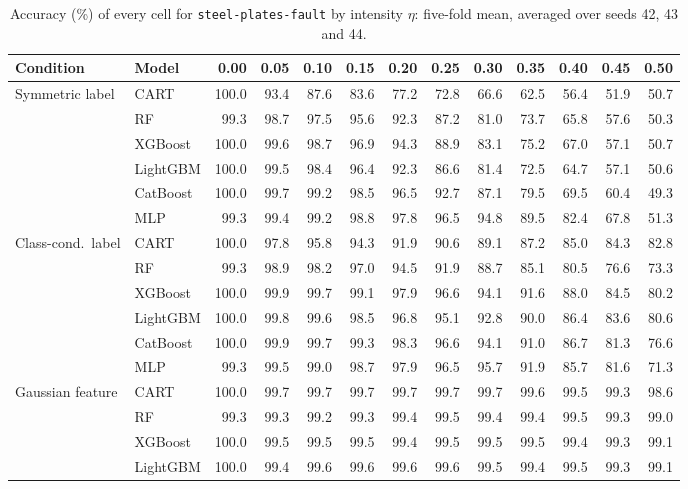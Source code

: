 \begin{table}[p]
\centering
\tiny
\setlength{\tabcolsep}{2.6pt}
\caption{Accuracy (\%) of every cell for \texttt{steel-plates-fault} by intensity $\eta$: five-fold mean, averaged over seeds 42, 43 and 44.}
\label{tab:grid_steel_plates_fault}
\begin{tabular}{@{}llrrrrrrrrrrr@{}}
\toprule
Condition & Model & 0.00 & 0.05 & 0.10 & 0.15 & 0.20 & 0.25 & 0.30 & 0.35 & 0.40 & 0.45 & 0.50 \\
\midrule
Symmetric label & CART & 100.0 & 93.4 & 87.6 & 83.6 & 77.2 & 72.8 & 66.6 & 62.5 & 56.4 & 51.9 & 50.7 \\
 & RF & 99.3 & 98.7 & 97.5 & 95.6 & 92.3 & 87.2 & 81.0 & 73.7 & 65.8 & 57.6 & 50.3 \\
 & XGBoost & 100.0 & 99.6 & 98.7 & 96.9 & 94.3 & 88.9 & 83.1 & 75.2 & 67.0 & 57.1 & 50.7 \\
 & LightGBM & 100.0 & 99.5 & 98.4 & 96.4 & 92.3 & 86.6 & 81.4 & 72.5 & 64.7 & 57.1 & 50.6 \\
 & CatBoost & 100.0 & 99.7 & 99.2 & 98.5 & 96.5 & 92.7 & 87.1 & 79.5 & 69.5 & 60.4 & 49.3 \\
 & MLP & 99.3 & 99.4 & 99.2 & 98.8 & 97.8 & 96.5 & 94.8 & 89.5 & 82.4 & 67.8 & 51.3 \\
\midrule
Class-cond.\ label & CART & 100.0 & 97.8 & 95.8 & 94.3 & 91.9 & 90.6 & 89.1 & 87.2 & 85.0 & 84.3 & 82.8 \\
 & RF & 99.3 & 98.9 & 98.2 & 97.0 & 94.5 & 91.9 & 88.7 & 85.1 & 80.5 & 76.6 & 73.3 \\
 & XGBoost & 100.0 & 99.9 & 99.7 & 99.1 & 97.9 & 96.6 & 94.1 & 91.6 & 88.0 & 84.5 & 80.2 \\
 & LightGBM & 100.0 & 99.8 & 99.6 & 98.5 & 96.8 & 95.1 & 92.8 & 90.0 & 86.4 & 83.6 & 80.6 \\
 & CatBoost & 100.0 & 99.9 & 99.7 & 99.3 & 98.3 & 96.6 & 94.1 & 91.0 & 86.7 & 81.3 & 76.6 \\
 & MLP & 99.3 & 99.5 & 99.0 & 98.7 & 97.9 & 96.5 & 95.7 & 91.9 & 85.7 & 81.6 & 71.3 \\
\midrule
Gaussian feature & CART & 100.0 & 99.7 & 99.7 & 99.7 & 99.7 & 99.7 & 99.7 & 99.6 & 99.5 & 99.3 & 98.6 \\
 & RF & 99.3 & 99.3 & 99.2 & 99.3 & 99.4 & 99.5 & 99.4 & 99.4 & 99.5 & 99.3 & 99.0 \\
 & XGBoost & 100.0 & 99.5 & 99.5 & 99.5 & 99.4 & 99.5 & 99.5 & 99.5 & 99.4 & 99.3 & 99.1 \\
 & LightGBM & 100.0 & 99.4 & 99.6 & 99.6 & 99.6 & 99.6 & 99.5 & 99.4 & 99.5 & 99.3 & 99.1 \\

\end{tabular}
\end{table}
